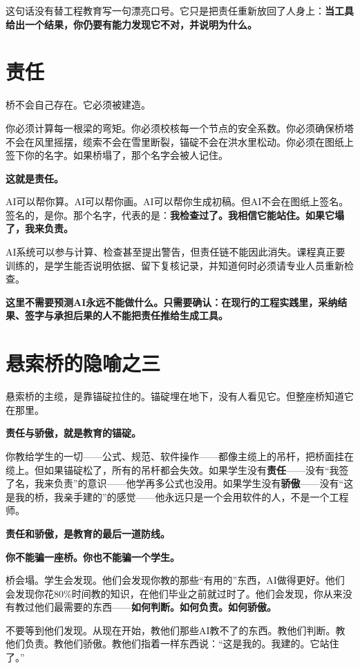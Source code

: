 这句话没有替工程教育写一句漂亮口号。它只是把责任重新放回了人身上：\textbf{当工具给出一个结果，你仍要有能力发现它不对，并说明为什么。}

\section{责任}

桥不会自己存在。它必须被建造。

你必须计算每一根梁的弯矩。你必须校核每一个节点的安全系数。你必须确保桥塔不会在风里摇摆，缆索不会在雪里断裂，锚碇不会在洪水里松动。你必须在图纸上签下你的名字。如果桥塌了，那个名字会被人记住。

\textbf{这就是责任。}

AI可以帮你算。AI可以帮你画。AI可以帮你生成初稿。但AI不会在图纸上签名。签名的，是你。那个名字，代表的是：\textbf{我检查过了。我相信它能站住。如果它塌了，我来负责。}

AI系统可以参与计算、检查甚至提出警告，但责任链不能因此消失。课程真正要训练的，是学生能否说明依据、留下复核记录，并知道何时必须请专业人员重新检查。

\textbf{这里不需要预测AI永远不能做什么。只需要确认：在现行的工程实践里，采纳结果、签字与承担后果的人不能把责任推给生成工具。}

\section{悬索桥的隐喻之三}

悬索桥的主缆，是靠锚碇拉住的。锚碇埋在地下，没有人看见它。但整座桥知道它在那里。

\textbf{责任与骄傲，就是教育的锚碇。}

你教给学生的一切——公式、规范、软件操作——都像主缆上的吊杆，把桥面挂在缆上。但如果锚碇松了，所有的吊杆都会失效。如果学生没有\textbf{责任}——没有``我签了名，我来负责''的意识——他学再多公式也没用。如果学生没有\textbf{骄傲}——没有``这是我的桥，我亲手建的''的感觉——他永远只是一个会用软件的人，不是一个工程师。

\textbf{责任和骄傲，是教育的最后一道防线。}

\begin{shiyu-note}
\label{note:chap12}

\textbf{你不能骗一座桥。你也不能骗一个学生。}

桥会塌。学生会发现。他们会发现你教的那些``有用的''东西，AI做得更好。他们会发现你花80\%时间教的知识，在他们毕业之前就过时了。他们会发现，你从来没有教过他们最需要的东西——\textbf{如何判断。如何负责。如何骄傲。}

不要等到他们发现。从现在开始，教他们那些AI教不了的东西。教他们判断。教他们负责。教他们骄傲。教他们指着一样东西说：``这是我的。我建的。它站住了。''
\end{shiyu-note}

